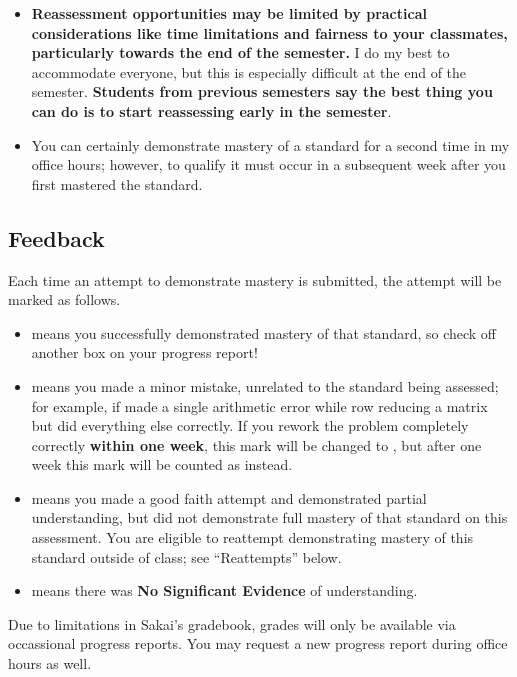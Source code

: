 \documentclass[letterpaper]{article}
\begin{document}
{\begin{enumerate}[1)]
\begin{itemize}
    \item \textbf{Reassessment opportunities may be limited by practical considerations like time limitations and fairness to your classmates, particularly towards the end of the semester.}  I do my best to accommodate everyone, but this is especially difficult at the end of the semester.  {\bf Students from previous semesters say the best thing you can do is to start reassessing early in the semester}.
    \item You can certainly demonstrate mastery of a standard for a second time in my office hours; however, to qualify it must occur in a subsequent week after you first mastered the standard.
    \end{itemize}
    \end{enumerate}
}{
    \subsection*{\fontsize{10}{12}\selectfont Feedback}
    Each time an attempt to demonstrate mastery is submitted, the attempt will be marked as follows.
    \begin{itemize}
    \item \masteryMark{} means you successfully demonstrated mastery of that standard, so check off another box on your progress report!
    \item \minorMark{} means you made a minor mistake, unrelated to the standard being assessed; for example, if made a single arithmetic error while row reducing a matrix but did everything else correctly. If you rework the problem completely correctly \textbf{within one week}, this mark will be changed to \masteryMark{}, but after one week this mark will be counted as \reattemptMark{} instead.
    \item \reattemptMark{} means you made a good faith attempt and demonstrated partial understanding, but did not demonstrate full mastery of that standard on this assessment. You are eligible to reattempt demonstrating mastery of this standard outside of class; see ``Reattempts'' below.
    \item \noMark{} means there was {\bf No Significant Evidence} of understanding.
    \end{itemize}
    Due to limitations in Sakai's gradebook, grades will only be available via occassional progress reports. You may request a new progress report during office hours as well.


}
\end{document}
